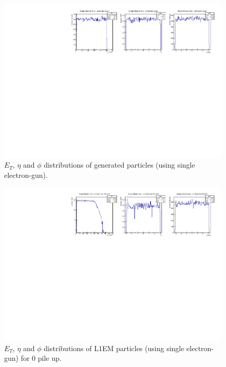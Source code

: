 \begin{figure}[!htb]
  \centering
  \includegraphics[scale=0.8]{../SimulationTools/GenParticles_EtEtaPhi.pdf}
  \caption{$E_{T}$, $\eta$ and $\phi$ distributions of generated particles (using single electron-gun).}
  \label{}
\end{figure}

\begin{figure}[!htb]
  \centering
  \includegraphics[scale=0.8]{../SimulationTools/L1EM_EtEtaPhi_0PileUP.pdf}
  \caption{$E_{T}$, $\eta$ and $\phi$ distributions of L1EM particles (using single electron-gun) for 0 pile up.}
  \label{}
\end{figure}

